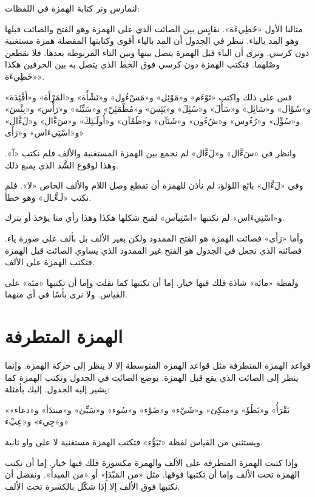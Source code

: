 \documentclass[
  english,
  10pt,
]{article}
\begin{document}
\begin{otherlanguage}{arabic}
لنمارس ونر كتابة الهمزة في اللفظات:

مثالنا الأول «خَطِيءَة». نقايِس بين الصائت الذي على الهمزة وهو الفتح والصائت
قبلها وهو المد بالياء. ننظر في الجدول أن المد بالياء أقوى وكتابتها
المفضلة همزة مستغنية دون كرسي. ونرى أن الياء قبل الهمزة يتصل بينها وبين
التاء المربوطة بعدها. فلا نقطعن وصْلهما. فنكتب الهمزة دون كرسي فوق الخط
الذي يتصل به بين الحرفين هكذا «خَطِيءَة».

قس على ذلك واكتب «تَوْءَم» و«مَوْئِل» و«مَسْءُول» و«نَشْأَة» و«المَرْأَة» و«أَفْئِدَة»
و«سُؤَال» و«سَائِل» و«سَأَلَ» و«سُئِلَ» و«يَئِسَ» و«مُطْمَئِنّ» و«سَيِّئَة» و«رَأْس» و«بِئْسَ»
و«سُؤْل» و«رُءُوس» و«شُءُون» و«شَنَآن» و«ظَمْآن» و«أُولَـٰئِكَ» و«سَءَّال» و«لَءَّال»
و«اسْتِيءَاس» و«رَأَى»

وانظر في «سَءَّال» و«لَءَّال» لم نجمع بين الهمزة المستغنية والألف فلم نكتب
«آ». وهذا لوقوع الشَّد الذي يمنع ذلك.

وفي «لَءَّال» بائع اللؤلؤ، لم نأذن للهمزة أن تقطع وصل اللام والألف الخاص
«لا». فلم نكتب «لَـءَّـال» وهو خطأ.

و«اسْتِيءَاس» لم نكتبها «اسْتِيآس» لقبح شكلها هكذا وهذا رأي منا يؤخذ أو يترك.

وأما «رَأَى» فصائت الهمزة هو الفتح الممدود ولكن بغير الألف بل بألف على
صورة ياء. فصائته الذي نجعل في الجدول هو الفتح غير الممدود الذي يساوي
الصائت قبل الهمزة فتكتب الهمزة على الألف.

ولفظة «مائة» شاذة فلك فيها خيار. إما أن تكتبها كما نقلت وإما أن تكتبها
«مئة» على القياس. ولا نرى بأسًا في أي منهما.

\end{otherlanguage}

\section{\texorpdfstring{\foreignlanguage{arabic}{\altfamily الهمزة
المتطرفة}}{الهمزة المتطرفة}}\label{ux627ux644ux647ux645ux632ux629-ux627ux644ux645ux62aux637ux631ux641ux629}

\begin{otherlanguage}{arabic}

\altfamily 

قواعد الهمزة المتطرفة مثل قواعد الهمزة المتوسطة إلا لا ينظر إلى حركة
الهمزة. وإنما ينظر إلى الصائت الذي يقع قبل الهمزة. يوضع الصائت في الجدول
وتكتب الهمزة كما يشير إليه الجدول. إليك بأمثلة:

«يَقْرَأُ» و«بَطُؤَ» و«متكِئ» و«شَيْء» و«ضَوْء» و«سُوء» و«سَيِّئ» و«مبتدَأ» و«دعاء»
و«جِيء» و«عِبْء»

ويستثنى من القياس لفظة «تَبَوُّء» فتكتب الهمزة مستغنية لا على واو ثانية.

وإذا كتبت الهمزة المتطرفة على الألف والهمزة مكسورة فلك فيها خيار. إما أن
تكتب الهمزة تحت الألف وإما أن تكتبها فوقها. مثل «من المَبْدَإِ» أو «من
المبدأ». ونفضل أن نكتبها فوق الألف إلا إذا شكّل بالكسرة تحت الألف.

\end{otherlanguage}
\end{document}
